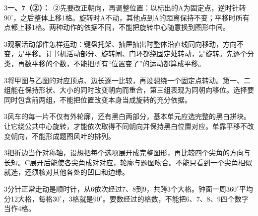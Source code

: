 \documentclass[multi=snippet,border={5bp 20bp 5bp 5bp}]{standalone}
\newenvironment{snippet}[3]{\begin{minipage}{#1bp}\color{answerred}\fontsize{#2}{#3}\selectfont\raggedright}{\end{minipage}}
\begin{document}
\begin{snippet}{505}{11.5}{14}\begin{multicols}{3}\raggedcolumns \textbf{一、7（②）：}\ ②先要改正朝向，再调整位置：以标出的A为固定点，逆时针转\(90^\circ\)\allowbreak ，之后整体上移1格。旋转时A不动，其他点到A的距离保持不变；平移时所有点都上移1格。两种动作的依据不同，不能把旋转中心随意换到图形中间。\end{multicols}\end{snippet}
\begin{snippet}{505}{11.5}{14}\begin{multicols}{3}\raggedcolumns 观察活动部件怎样运动：键盘托架、抽屉抽出时整体沿直线同向移动，方向不变，是平移。订书机活动部分、旋转闸、门环都绕固定处转动，是旋转。先逐个分类，再数平移的个数，不能把所有“位置变了”的运动都算成平移。\end{multicols}\end{snippet}
\begin{snippet}{505}{11.5}{14}\begin{multicols}{3}\raggedcolumns 将甲图与乙图的对应顶点、边长逐一比较，再设想绕一个固定点转动。第一、二组能在保持形状、大小的同时改变朝向而重合，第三组表现为同朝向移位。选择要同时包含前两组，不能把位置改变本身当成旋转的充分依据。\end{multicols}\end{snippet}
\begin{snippet}{505}{11.5}{14}\begin{multicols}{3}\raggedcolumns 风车的每一片不仅有外轮廓，还有黑白两部分，基本单元应选完整的黑白拼块。让它绕公共中心旋转，才能依次取得不同朝向并保持黑白位置对应。单靠平移不改变朝向，不能形成题图风叶的排列。\end{multicols}\end{snippet}
\begin{snippet}{505}{11.5}{14}\begin{multicols}{3}\raggedcolumns 把折边当作对称轴，设想把每个选项展开成完整图形，再比较四个尖角的方向与长短。C展开后能使各尖角成对对应，轮廓与题图吻合。不能只看到一个尖角相似就选，还须核对其他各处的凹口和边缘。\end{multicols}\end{snippet}
\begin{snippet}{505}{11.5}{14}\begin{multicols}{3}\raggedcolumns 分针正常走动是顺时针，从6依次经过7、8到9，共跨3个大格。钟面一周\(360^\circ\)\allowbreak 平均分12大格，每格\(30^\circ\)\allowbreak ，3格就是\(90^\circ\)\allowbreak 。要数经过的格数，不能把6、7、8、9四个数字当作4格。\end{multicols}\end{snippet}
\end{document}
